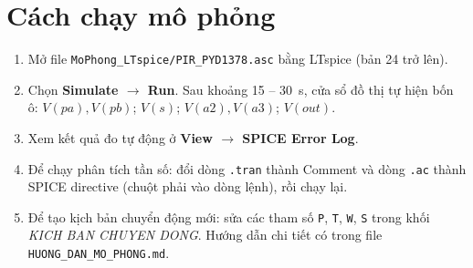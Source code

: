 \section{Cách chạy mô phỏng}
\begin{enumerate}
  \item Mở file \texttt{MoPhong\_LTspice/PIR\_PYD1378.asc} bằng LTspice (bản 24 trở lên).
  \item Chọn \textbf{Simulate $\to$ Run}. Sau khoảng 15 -- 30~s, cửa sổ đồ thị tự hiện bốn ô: $V(pa), V(pb)$; $V(s)$; $V(a2), V(a3)$; $V(out)$.
  \item Xem kết quả đo tự động ở \textbf{View $\to$ SPICE Error Log}.
  \item Để chạy phân tích tần số: đổi dòng \texttt{.tran} thành Comment và dòng \texttt{.ac} thành SPICE directive (chuột phải vào dòng lệnh), rồi chạy lại.
  \item Để tạo kịch bản chuyển động mới: sửa các tham số \texttt{P}, \texttt{T}, \texttt{W}, \texttt{S} trong khối \emph{KICH BAN CHUYEN DONG}. Hướng dẫn chi tiết có trong file \texttt{HUONG\_DAN\_MO\_PHONG.md}.
\end{enumerate}

